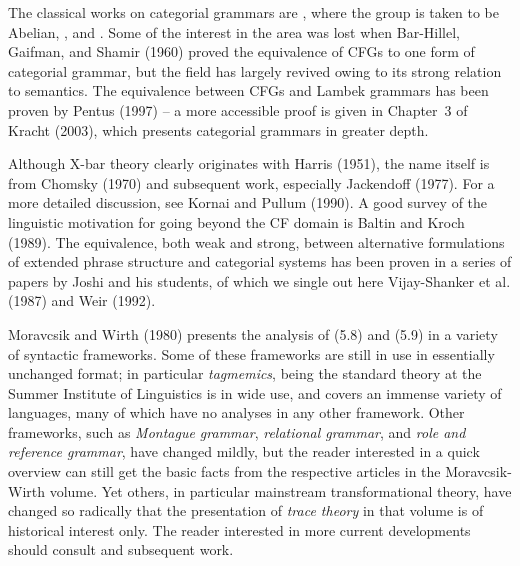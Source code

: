 The classical works on categorial grammars are ,
where the group is taken to be Abelian, , and
. Some of the interest in the area was lost when
Bar-Hillel, Gaifman, and Shamir (1960) proved the equivalence of CFGs to one
form of categorial grammar, but the field has largely revived owing to its
strong relation to semantics. The equivalence between CFGs and Lambek grammars
has been proven by Pentus (1997) -- a more accessible proof is given in
Chapter~3 of Kracht (2003), which presents categorial grammars in greater
depth.  \nocite{Pentus:1997} \nocite{Bar-Hillel:1960}

Although X-bar theory clearly originates with Harris (1951), the name itself is
from Chomsky (1970) and subsequent work, especially Jackendoff (1977). For a
more detailed discussion, see Kornai and Pullum (1990). A good survey of the
linguistic motivation for going beyond the CF domain is Baltin and Kroch
(1989).  \nocite{Baltin:1989} The equivalence, both weak and strong, between
alternative formulations of extended phrase structure and categorial systems
has been proven in a series of papers by Joshi and his students, of which we
single out here Vijay-Shanker et al. (1987) and Weir (1992).
\nocite{Kornai:1990} \nocite{Weir:1992} \nocite{Vijay-Shanker:1987}
\nocite{Moravcsik:1980}\nocite{Chomsky:1970}\nocite{Jackendoff:1977}

Moravcsik and Wirth (1980) presents the analysis of (5.8) and (5.9) in a
variety of syntactic frameworks. Some of these frameworks are still in use in
essentially unchanged format; in particular {\it tagmemics}, being the
standard theory at the Summer Institute of Linguistics is in wide use, and
covers an immense variety of languages, many of which have no analyses in any
other framework.  Other frameworks, such as {\it Montague grammar}, {\it
  relational grammar}, and {\it role and reference grammar}, have changed
mildly, but the reader interested in a quick overview can still get the basic
facts from the respective articles in the Moravcsik-Wirth volume. Yet others,
in particular mainstream transformational theory, have changed so radically
that the presentation of {\it trace theory} in that volume is of historical
interest only. The reader interested in more current developments should
consult  and subsequent work.\nocite{Moravcsik:1980}

